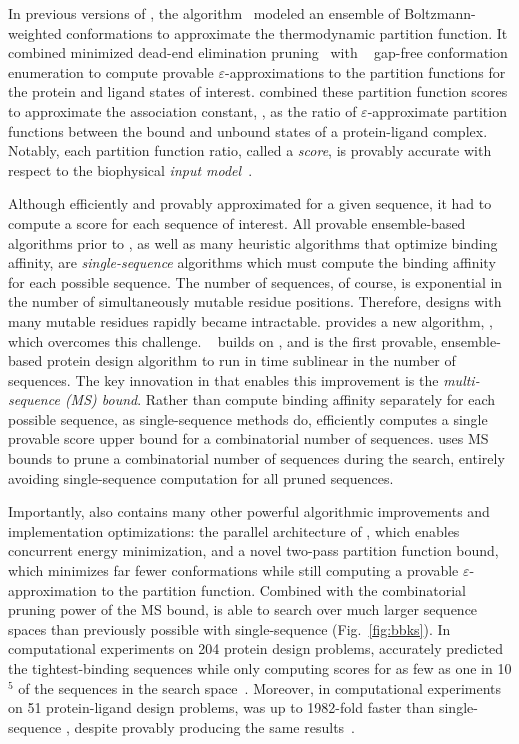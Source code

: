 \def\multisequencebound{MS\xspace}
\def\msbound{\multisequencebound}


\newcommand{\cut}[1]{}

In previous versions of \osprey, the \ks algorithm~\cite{K*} modeled an ensemble of Boltzmann-weighted conformations to approximate the thermodynamic partition function. It combined minimized dead-end elimination pruning~\cite{DEE} with \as~\cite{DEE,A*} gap-free conformation enumeration to compute provable $\varepsilon$-approximations to the partition functions for the protein and ligand states of interest. \ks combined these partition function scores to approximate the association constant, \ka, as the ratio of $\varepsilon$-approximate partition functions between the bound and unbound states of a protein-ligand complex. Notably, each partition function ratio, called a \ks \emph{score}, is provably accurate with respect to the biophysical \emph{input model}~\cite{K*,minDEE,iMinDEE}. 

Although \ks efficiently and provably approximated \ka for a given sequence, it had to compute a \ks score for each sequence of interest. All provable ensemble-based algorithms prior to \bbks, as well as many heuristic algorithms that optimize binding affinity, are \emph{single-sequence} algorithms which must compute the binding affinity for each possible sequence. The number of sequences, of course, is exponential in the number of simultaneously mutable residue positions.  Therefore, designs with many mutable residues rapidly became intractable.  provides a new algorithm, \bbks, which overcomes this challenge. \bbks~\cite{BBK*} builds on \ks, and is the first provable, ensemble-based protein design algorithm to run in time sublinear in the number of sequences. The key innovation in \bbks that enables this improvement is the \emph{multi-sequence (\msbound) bound}. Rather than compute binding affinity separately for each possible sequence, as single-sequence methods do, \bbks efficiently computes a single provable \ks score upper bound for a combinatorial number of sequences. \bbks uses \msbound bounds to prune a combinatorial number of sequences during the search, entirely avoiding single-sequence computation for all pruned sequences.

Importantly, \bbks also contains many other powerful algorithmic improvements and implementation optimizations: the parallel architecture of \bbks, which enables concurrent energy minimization, and a novel two-pass partition function bound, which minimizes far fewer conformations while still computing a provable $\varepsilon$-approximation to the partition function. Combined with the combinatorial pruning power of the \msbound bound, \bbks is able to search over much larger sequence spaces than previously possible with single-sequence \ks (Fig.~\ref{fig:bbks}). In computational experiments on 204 protein design problems, \bbks accurately predicted the tightest-binding sequences while only computing \ks scores for as few as one in 10$^5$ of the sequences in the search space~\cite{BBK*}.  Moreover, in computational experiments on 51 protein-ligand design problems, \bbks was up to 1982-fold faster than single-sequence \ks, despite provably producing the same results~\cite{BBK*}.  

